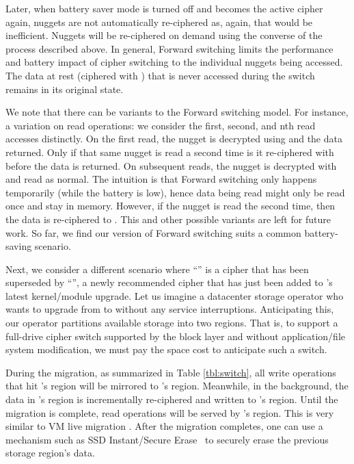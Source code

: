 Later, when battery saver mode is turned off and \cone becomes the active cipher
again, nuggets are not automatically re-ciphered as, again, that would be
inefficient. Nuggets will be re-ciphered on demand using the converse of the
process described above. In general, Forward switching limits the performance
and battery impact of cipher switching to the individual nuggets being accessed.
The data at rest (ciphered with \cone) that is never accessed during the switch
remains in its original state.

We note that there can be variants to the Forward switching model. For instance,
a variation on read operations: we consider the first, second, and nth read
accesses distinctly. On the first read, the nugget is decrypted using \cone and
the data returned. Only if that same nugget is read a second time is it
re-ciphered with \ctwo before the data is returned. On subsequent reads, the
nugget is decrypted with \ctwo and read as normal. The intuition is that Forward
switching only happens temporarily (\eg while the battery is low), hence data
being read might only be read once and stay in memory. However, if the nugget is
read the second time, then the data is re-ciphered to \ctwo. This and other
possible variants are left for future work. So far, we find our version of
Forward switching suits a common battery-saving scenario.



 Next, we consider a different scenario where
``\cone'' is a cipher that has been superseded by ``\ctwo'', a newly recommended
cipher that has just been added to \sys's latest kernel/module upgrade. Let us
imagine a datacenter storage operator who wants to upgrade from \cone to \ctwo
without any service interruptions. Anticipating this, our operator partitions
available storage into two regions. That is, to support a full-drive cipher
switch supported by the block layer and without application/file system
modification, we must pay the space cost to anticipate such a switch.

During the migration, as summarized in Table \cref{tbl:switch}, all write
operations that hit \cone's region will be mirrored to \ctwo's region.
Meanwhile, in the background, the data in \cone's region is incrementally
re-ciphered and written to \ctwo's region. Until the migration is complete, read
operations will be served by \cone's region. This is very similar to VM live
migration \cite{live-vm-migration}. After the migration completes, one can use a
mechanism such as SSD Instant/Secure Erase~\cite{ISE1,ISE2,ISE3} to securely
erase the previous storage region's data.

